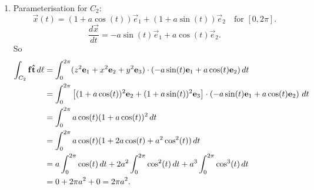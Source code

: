 \documentclass[10pt, a4paper]{article}
\begin{document}
\begin{problem}[$2015$ question $8$]
\begin{solution}
\begin{enumerate}[label = (\alph*)]
            \item Parameterisation for $C_2$:
            \[
            \vec{x}(t) = (1 + a\cos(t))\vec{e}_1 + (1 + a\sin(t))\vec{e}_2\quad\text{for } [0, 2\pi].
            \]
            \[
            \frac{d\vec{x}}{dt} = -a\sin(t)\vec{e}_1 + a\cos(t)\vec{e}_2.
            \]
            So
            \begin{align*}
                \int_{C_2}\mathbf{f}\mathbf{\hat{t}}\,d\ell &= \int_{0}^{2\pi}(z ^ 2\mathbf{e}_1 + x ^ 2\mathbf{e}_2 + y ^ 2\mathbf{e}_3) \cdot (-a\sin(t)\mathbf{e}_1 + a\cos(t)\mathbf{e}_2)\,dt \\
                &= \int_{0}^{2\pi}\left[(1 + a\cos(t)) ^ 2\mathbf{e}_2 + (1 + a\sin(t)) ^ 2\mathbf{e}_3\right]\cdot\left(-a\sin(t)\mathbf{e}_1 + a\cos(t)\mathbf{e}_2\right)\,dt \\
                &= \int_{0}^{2\pi}a\cos(t)(1 + a\cos(t)) ^ 2\,dt \\
                &= \int_{0}^{2\pi}a\cos(t)(1 + 2a\cos(t) + a ^ 2\cos ^ 2(t))\,dt \\
                &= a\int_{0}^{2\pi}\cos(t)\,dt + 2a ^ 2\int_{0}^{2\pi}\cos ^ 2(t)\,dt + a ^ 3\int_{0}^{2\pi}\cos ^ 3(t)\,dt \\
                &= 0 + 2\pi a ^ 2 + 0 = 2\pi a ^ 2.
            \end{align*}


\end{enumerate}
\end{solution}
\end{problem}
\end{document}
